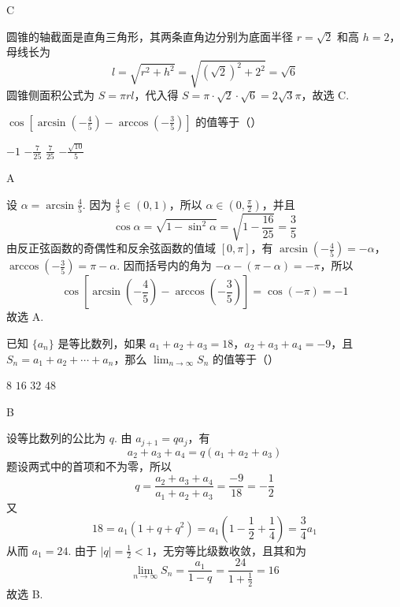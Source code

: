 \documentclass[UTF8,a4paper,oneside,11pt]{ctexbook}
\begin{document}
\begin{answer}
C
\end{answer}

\begin{solution}
圆锥的轴截面是直角三角形，其两条直角边分别为底面半径 \(r=\sqrt{2}\) 和高 \(h=2\)，母线长为
\[
l=\sqrt{r^2+h^2}=\sqrt{(\sqrt{2})^2+2^2}=\sqrt{6}
\]
圆锥侧面积公式为 \(S=\pi r l\)，代入得 \(S=\pi\cdot\sqrt{2}\cdot\sqrt{6}=2\sqrt{3}\pi\)，故选 C.
\end{solution}

\begin{problem}
\(\cos \left[\arcsin \left(-\frac{4}{5}\right) - \arccos \left(-\frac{3}{5}\right)\right]\) 的值等于（\quad）

\choices
    {\(-1\)}
    {\(-\frac{7}{25}\)}
    {\(\frac{7}{25}\)}
    {\(-\frac{\sqrt{10}}{5}\)}
\end{problem}

\begin{answer}
A
\end{answer}

\begin{solution}
设 \(\alpha=\arcsin\frac45\). 因为 \(\frac{4}{5}\in(0,1)\)，所以 \(\alpha\in(0,\frac{\pi}{2})\)，并且
\[
\cos\alpha=\sqrt{1-\sin^2\alpha}=\sqrt{1-\frac{16}{25}}=\frac35
\]
由反正弦函数的奇偶性和反余弦函数的值域 \([0,\pi]\)，有 \(\arcsin(-\frac45)=-\alpha\)，\(\arccos(-\frac35)=\pi-\alpha\). 因而括号内的角为 \(-\alpha-(\pi-\alpha)=-\pi\)，所以
\[
\cos\left[\arcsin\left(-\frac45\right)-\arccos\left(-\frac35\right)\right]=\cos(-\pi)=-1
\]
故选 A.
\end{solution}

\begin{problem}
已知 \(\{a_n\}\) 是等比数列，如果 \(a_1 + a_2 + a_3 = 18\)，\(a_2 + a_3 + a_4 = -9\)，且 \(S_n = a_1 + a_2 + \cdots + a_n\)，那么 \(\displaystyle\lim_{n \to \infty} S_n\) 的值等于（\quad）

\choices
    {\(8\)}
    {\(16\)}
    {\(32\)}
    {\(48\)}
\end{problem}

\begin{answer}
B
\end{answer}

\begin{solution}
设等比数列的公比为 \(q\). 由 \(a_{j+1}=qa_j\)，有
\[
a_2+a_3+a_4=q(a_1+a_2+a_3)
\]
题设两式中的首项和不为零，所以
\[
q=\frac{a_2+a_3+a_4}{a_1+a_2+a_3}=\frac{-9}{18}=-\frac12
\]
又
\[
18=a_1(1+q+q^2)=a_1\left(1-\frac12+\frac14\right)=\frac34a_1
\]
从而 \(a_1=24\). 由于 \(|q|=\frac12<1\)，无穷等比级数收敛，且其和为
\[
\lim_{n\to\infty}S_n=\frac{a_1}{1-q}=\frac{24}{1+\frac12}=16
\]
故选 B.
\end{solution}
\end{document}
